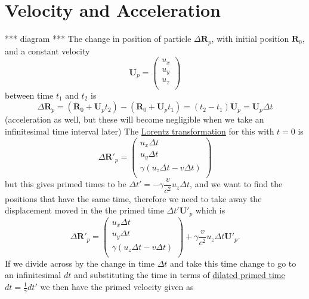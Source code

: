 \chapter{Velocity and Acceleration}
*** diagram *** \newline
The change in position of particle $\Delta \mathbf{R}_p$, with initial position $\mathbf{R}_0$, and a constant velocity 
\begin{equation}%
    \mathbf{U}_p = \begin{pmatrix}
    u_x \\ u_y \\ u_z \\
    \end{pmatrix}
\end{equation}%
between time $t_1$ and $t_2$ is
\begin{equation}%
    \Delta \mathbf{R}_p = (\mathbf{R}_0 +\mathbf{U}_p t_2) - (\mathbf{R}_0 +\mathbf{U}_p t_1) =  (t_2 - t_1) \mathbf{U}_p =  \mathbf{U}_p \Delta t 
\end{equation}%
(acceleration as well, but these will become negligible when we take an infinitesimal time interval later)
The \hyperlink{def-lorentz-transform}{Lorentz transformation} for this with $t=0$ is 
\begin{equation}%
    \Delta \mathbf{R}'_p = \begin{pmatrix}
    u_x \Delta t\\ u_y \Delta t \\ \gamma \left( u_z \Delta t - v \Delta t \right) \\
    \end{pmatrix}
\end{equation}%
but this gives primed times to be $\Delta t'=-\gamma\dfrac{v}{c^2} u_z \Delta t$, and we want to find the positions that have the same time, therefore we need to take away the displacement moved in the the primed time $\Delta t' \mathbf{U'}_p $ which is
\begin{equation}%
    \Delta \mathbf{R}'_p = \begin{pmatrix}
    u_x \Delta t\\ u_y \Delta t \\ \gamma \left( u_z \Delta t - v \Delta t \right) \\
    \end{pmatrix} + \gamma\dfrac{v}{c^2} u_z \Delta t  \mathbf{U'}_p.
\end{equation}%
If we divide across by the change in time $\Delta t$ and take this time change to go to an infinitesimal $dt$ and substituting the time in terms of \hyperlink{def-time-dilation}{dilated primed time} $dt = \frac{1}{\gamma}dt'$ we then have the primed velocity given as 
